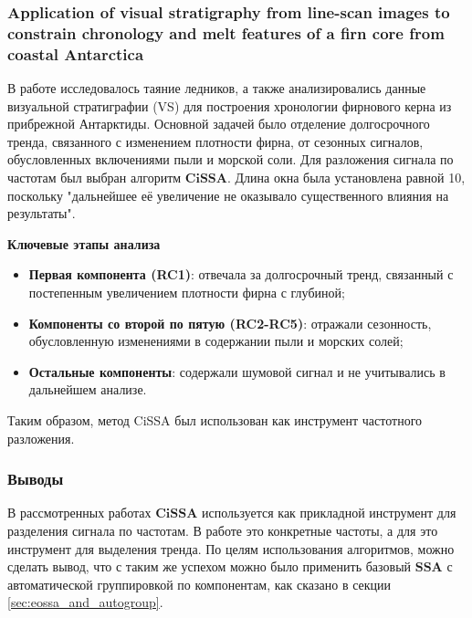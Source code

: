 \documentclass[a4paper, 11pt]{article}
\newcommand{\SSA}{\textbf{SSA}}
\newcommand{\CISSA}{\textbf{CiSSA}}
\begin{document}
\subsubsection{Application of visual stratigraphy from line-scan images to constrain chronology and melt features of a firn core from coastal Antarctica}

В работе \cite{Dey_Thamban_Laluraj_Mahalinganathan_Redkar_Kumar_Matsuoka_2023} исследовалось таяние ледников, а также анализировались данные визуальной стратиграфии (VS) для построения хронологии фирнового керна из прибрежной Антарктиды. Основной задачей было отделение долгосрочного тренда, связанного с изменением плотности фирна, от сезонных сигналов, обусловленных включениями пыли и морской соли.
Для разложения сигнала по частотам был выбран алгоритм $\CISSA$. Длина окна была установлена равной 10, поскольку "дальнейшее её увеличение не оказывало существенного влияния на результаты".

\noindent \textbf{Ключевые этапы анализа}

\begin{itemize}
	\item \textbf{Первая компонента (RC1)}: отвечала за долгосрочный тренд, связанный с постепенным увеличением плотности фирна с глубиной;
	\item \textbf{Компоненты со второй по пятую (RC2-RC5)}: отражали сезонность, обусловленную изменениями в содержании пыли и морских солей;
	\item \textbf{Остальные компоненты}: содержали шумовой сигнал и не учитывались в дальнейшем анализе.
\end{itemize}

Таким образом, метод CiSSA был использован как инструмент частотного разложения.

\subsubsection{Выводы}

В рассмотренных работах $\CISSA$ используется как прикладной инструмент для разделения сигнала по частотам. В работе \cite{cognitive} это конкретные частоты, а для \cite{Dey_Thamban_Laluraj_Mahalinganathan_Redkar_Kumar_Matsuoka_2023} это инструмент для выделения тренда. По целям использования алгоритмов, можно сделать вывод, что с таким же успехом можно было применить базовый $\SSA$ с автоматической группировкой по компонентам, как сказано в секции \ref{sec:eossa_and_autogroup}.


\newpage
\end{document}
